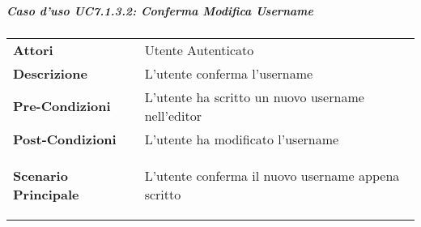 \subparagraph{Caso d'uso UC7.1.3.2:  Conferma Modifica Username}
\label{UC7_1_3_2}

\begin{tabular}{ l | p{11cm}}
	\hline
	\rowcolor{Gray}
	 \multicolumn{2}{c}{UC7.1.3.2 - Conferma Modifica Username} \\
	 \hline
	\textbf{Attori} & Utente Autenticato \\
	\textbf{Descrizione} & L'utente conferma l'username\\
	\textbf{Pre-Condizioni} & L'utente ha scritto un nuovo username nell'editor\\
	\textbf{Post-Condizioni} & L'utente ha modificato l'username\\
	\textbf{Scenario Principale} & 
	\begin{enumerate*}[label=(\arabic*.),itemjoin={\newline}]
		\item L'utente conferma il nuovo username appena scritto
	\end{enumerate*}\\
\end{tabular}
